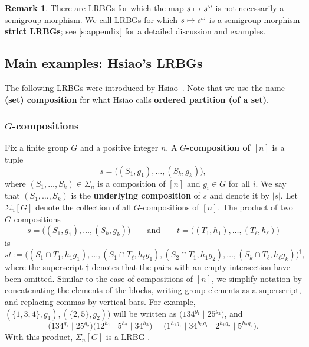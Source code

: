 \documentclass[11pt, oneside, reqno]{amsart}
\theoremstyle{definition}
\newtheorem{remark}[theorem]{Remark}
\numberwithin{equation}{section}
\newcommand{\defn}[1]{{\color{RoyalBlue}\bf#1}}
\def \gsetcomposition{{\Sigma_n[G]}}
\def \hsiao {{\gsetcomposition}}
\def\qqand{\qquad\text{and}\qquad}
\newcommand{\abs}[1]{|{#1}|} 				%
\begin{document}
\begin{remark}
    There are LRBGs for which the map $s \xmapsto{} s^\omega$
    is not necessarily a semigroup morphism.
    We call LRBGs for which $s \xmapsto{} s^\omega$
    is a semigroup morphism \defn{strict LRBGs}; see \cref{s:appendix} for
    a detailed discussion and examples.
\end{remark}

\subsection{Main examples: Hsiao's LRBGs}\label{ss:Hsiao's}
The following LRBGs were introduced by Hsiao~\citep{hsiao2007semigroup}.
Note that we use the name \defn{(set) composition} for what Hsiao calls \defn{ordered partition (of a set)}.

\subsubsection{$G$-compositions}

Fix a finite group $G$ and a positive integer $n$.
A \defn{$G$-composition of $[n]$} is a tuple
\begin{equation*}
    s = \big( (S_1,g_1),\dots,(S_k,g_k) \big),
\end{equation*}
where $(S_1,\dots,S_k) \in \Sigma_n$ is a composition of $[n]$ and $g_i \in G$ for all $i$.
We say that $(S_1,\dots,S_k)$ is the \defn{underlying composition} of $s$ and denote it by $\abs{s}$. 
Let $\hsiao$ denote the collection of all $G$-compositions of $[n]$.
The product of two $G$-compositions
\[   s = \big( (S_1,g_1),\dots,(S_k,g_k) \big) \qqand t = \big( (T_1,h_1),\dots,(T_\ell,h_\ell) \big)    \]
is
\[
    st := \big(
        (S_1 \cap T_1 , h_1 g_1),\dots,(S_1 \cap T_\ell, h_\ell g_1),
        (S_2 \cap T_1 , h_1 g_2),
        \dots,
        (S_k \cap T_\ell , h_\ell g_k)
    \big)^\dagger,
\]
where the superscript $\dagger$ denotes that the pairs with an empty intersection have been omitted.
Similar to the case of compositions of $[n]$, we simplify notation by concatenating the elements of the blocks, writing group elements as a superscript, and replacing commas by vertical bars.
For example, $( \{1,3,4\} , g_1) , ( \{2,5\}, g_2) \big) $ will be written as $\big(134^{g_1} \mid 25^{g_2}\big)$, and
\[
    \big(134^{g_1} \mid 25^{g_2} \big)  \big( 12^{h_1} \mid 5^{h_2} \mid 34^{h_3} \big) = \big( 1^{h_1 g_1} \mid 34^{h_3 g_1} \mid 2^{h_1 g_2} \mid 5^{h_2 g_2}  \big).
\]
With this product, $\hsiao$ is a LRBG \citep{hsiao2007semigroup}.
\end{document}
